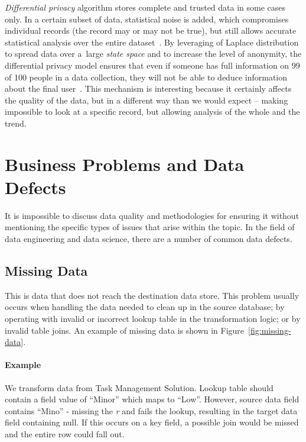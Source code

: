 \textit{Differential privacy} algorithm stores complete and trusted data in some cases only.
In a certain subset of data, statistical noise is added, which compromises individual records (the record may or may not be true), but still allows accurate statistical analysis over the entire dataset~\cite{difpriv2016}.
By leveraging of Laplace distribution to spread data over a~large \textit{state space} and to increase the level of anonymity, the differential privacy model ensures that even if someone has full information on 99 of 100 people in a data collection, they will not be able to deduce information about the final user~\cite{web:differential-privacy,dwork2014}.
This mechanism is interesting because it certainly affects the quality of the data, but in a different way than we would expect – making impossible to look at a specific record, but allowing analysis of the whole and the trend.

\section{Business Problems and Data Defects}

It is impossible to discuss data quality and methodologies for ensuring it without mentioning the specific types of issues that arise within the topic.
In the field of data engineering and data science, there are a number of common data defects.

\subsection*{Missing Data}

This is data that does not reach the destination data store.
This problem usually occurs when handling the data needed to clean up in the source database; by operating with invalid or incorrect lookup table in the transformation logic; or by invalid table joins.
An example of missing data is shown in Figure~\ref{fig:missing-data}.

\paragraph*{Example} We transform data from Task Management Solution.
Lookup table should contain a field value of \enquote{Minor} which maps to \enquote{Low}.
However, source data field contains \enquote{Mino} - missing the \textit{r} and fails the lookup, resulting in the target data field containing null.
If this occurs on a key field, a possible join would be missed and the entire row could fall out.

